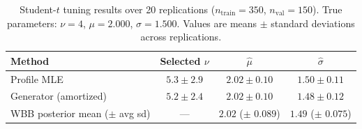 \begin{table}[H]
\centering
\caption{Student-$t$ tuning results over 20 replications ($n_{\mathrm{train}}=350$, $n_{\mathrm{val}}=150$). True parameters: $\nu=4$, $\mu=2.000$, $\sigma=1.500$. Values are means $\pm$ standard deviations across replications.}
\label{tab:t-dist-tuning}
\begin{tabular}{lccc}
\hline
Method & Selected $\nu$ & $\hat{\mu}$ & $\hat{\sigma}$ \\
\hline
Profile MLE & $5.3 \pm 2.9$ & $2.02 \pm 0.10$ & $1.50 \pm 0.11$ \\
Generator (amortized) & $5.2 \pm 2.4$ & $2.02 \pm 0.10$ & $1.48 \pm 0.12$ \\
WBB posterior mean ($\pm$ avg sd) & --- & $2.02$ ($\pm$ $0.089$) & $1.49$ ($\pm$ $0.075$) \\
\hline
\end{tabular}
\end{table}
